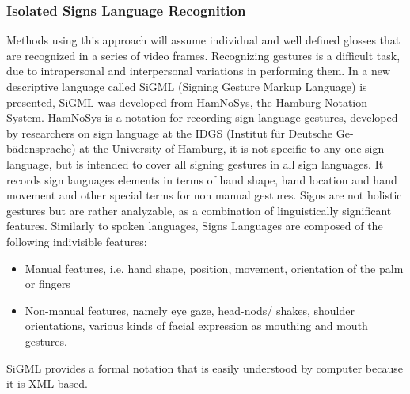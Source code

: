 \documentclass[twocolumn,conference]{article}
\begin{document}
\subsubsection{Isolated Signs Language Recognition}
Methods using this approach will assume individual and well defined glosses that are recognized in a series of video frames. Recognizing gestures is a difficult task, due to intrapersonal and interpersonal variations in performing them. In \cite{kennaway2015avatar} a new descriptive language called SiGML (Signing Gesture Markup Language) is presented, SiGML was developed from HamNoSys, the Hamburg Notation System. HamNoSys is a notation for recording sign language gestures, developed by researchers on sign language at the IDGS (Institut für Deutsche Ge-bädensprache) at the University of Hamburg, it is not specific to any one sign language, but is intended to cover all signing gestures in all sign languages. It records sign languages elements in terms of hand shape, hand location and hand movement and other special terms for non manual gestures. Signs are not holistic gestures but are rather analyzable, as a combination of linguistically significant features. Similarly to spoken languages, Signs Languages are composed of the following indivisible features\cite{adaloglou2020comprehensive}:
\begin{itemize}
\item Manual features, i.e. hand shape, position, movement, orientation of the palm or fingers
\item Non-manual features, namely eye gaze, head-nods/ shakes, shoulder orientations, various kinds of facial expression as mouthing and mouth gestures.
\end{itemize}
SiGML provides a formal notation that is easily understood by computer because it is XML based.
\end{document}
